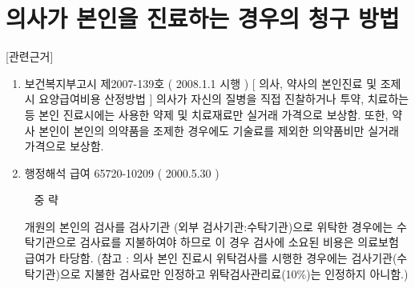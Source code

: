 \section{의사가 본인을 진료하는 경우의 청구 방법}
[관련근거]
\begin{enumerate}[(1)]\tightlist
\item 보건복지부고시 제2007-139호 ( 2008.1.1 시행 ) 
[ 의사, 약사의 본인진료 및 조제시 요양급여비용 산정방법 ]
의사가 자신의 질병을 직접 진찰하거나 투약, 치료하는 등 본인 진료시에는 사용한 약제 및 치료재료만 실거래 가격으로 보상함. 또한, 약사 본인이 본인의 의약품을 조제한 경우에도 기술료를 제외한 의약품비만 실거래 가격으로 보상함.
\item 행정해석 급여 65720-10209 ( 2000.5.30 ) \par
~ 중 략 ~ \par
개원의 본인의 검사를 검사기관 (외부 검사기관:수탁기관)으로 위탁한 경우에는 수탁기관으로 검사료를 지불하여야 하므로 이 경우 검사에 소요된 비용은 의료보험 급여가 타당함.
(참고 : 의사 본인 진료시 위탁검사를 시행한 경우에는 검사기관(수탁기관)으로 지불한 검사료만 인정하고 위탁검사관리료(10\%)는 인정하지 아니함.)
\end{enumerate}